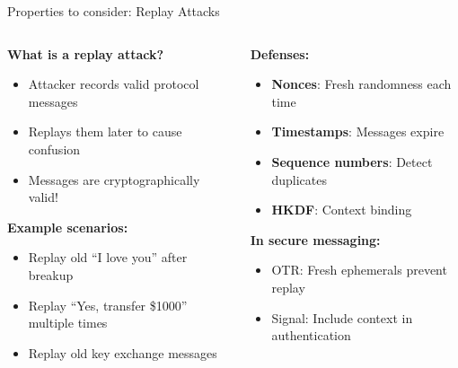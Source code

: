 \documentclass[aspectratio=169, lualatex, handout]{beamer}
\begin{document}
\begin{frame}{Properties to consider: Replay Attacks}
	\begin{columns}
		\begin{column}{0.5\textwidth}
			\textbf{What is a replay attack?}
			\begin{itemize}
				\item Attacker records valid protocol messages
				\item Replays them later to cause confusion
				\item Messages are cryptographically valid!
			\end{itemize}
			\textbf{Example scenarios:}
			\begin{itemize}
				\item Replay old ``I love you'' after breakup
				\item Replay ``Yes, transfer \$1000'' multiple times
				\item Replay old key exchange messages
			\end{itemize}
		\end{column}
		\begin{column}{0.5\textwidth}
			\textbf{Defenses:}
			\begin{itemize}
				\item \textbf{Nonces}: Fresh randomness each time
				\item \textbf{Timestamps}: Messages expire
				\item \textbf{Sequence numbers}: Detect duplicates
				\item \textbf{HKDF}: Context binding
			\end{itemize}
			\textbf{In secure messaging:}
			\begin{itemize}
				\item OTR: Fresh ephemerals prevent replay
				\item Signal: Include context in authentication
			\end{itemize}
		\end{column}
	\end{columns}
\end{frame}
\end{document}
